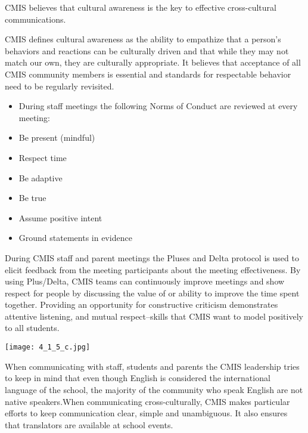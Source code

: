 

\begin{findings}
CMIS believes that cultural awareness is the key to effective cross-cultural communications. 

CMIS defines cultural awareness as the ability to empathize that a person's behaviors and reactions can be culturally driven and that while they may not match our own, they are culturally appropriate. It believes that acceptance of all CMIS community members is essential and standards for respectable behavior need to be regularly revisited. 


\begin{itemize}
\item During staff meetings the following Norms of Conduct are reviewed at every meeting:
\item Be present (mindful)
\item Respect time
\item Be adaptive
\item Be true
\item Assume positive intent
\item Ground statements in evidence
\end{itemize}

During CMIS staff and parent meetings the Pluses and Delta protocol is used to elicit feedback from the meeting participants about the meeting effectiveness. By using Plus/Delta, CMIS teams can continuously improve meetings and show respect for people by discussing the value of or ability to improve the time spent together. Providing an opportunity for constructive criticism demonstrates attentive listening, and mutual respect--skills that CMIS want to model positively to all  students.

\texttt{[image: 4\_1\_5\_c.jpg]}

When communicating with staff, students and parents the CMIS leadership tries to keep in mind that even though English is considered the international language of the school, the majority of the community who speak English are not native speakers.When communicating cross-culturally, CMIS makes particular efforts to keep communication clear, simple and unambiguous. It also ensures that translators are available at school events.


\end{findings}
